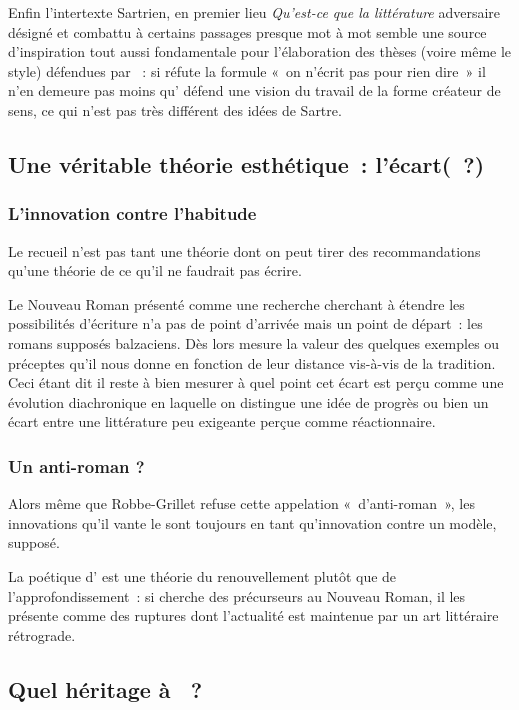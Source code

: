 \documentclass[12pt, a4paper]{article}
\begin{document}
    Enfin l'intertexte Sartrien, en premier lieu \textit{Qu'est-ce que la littérature} adversaire désigné et combattu à certains passages presque mot à mot semble une source d'inspiration tout aussi fondamentale pour l'élaboration des thèses (voire même le style) défendues par \robbe~: si \punr{} réfute la formule «~on n'écrit pas pour rien dire~» il n'en demeure pas moins qu'\robbe{} défend une vision du travail de la forme créateur de sens, ce qui n'est pas très différent des idées de Sartre.
\subsection{Une véritable théorie esthétique~: l'écart(~?)}
    \subsubsection{L'innovation contre l'habitude}
    
    Le recueil \punr{} n'est pas tant une théorie dont on peut tirer des recommandations qu'une théorie de ce qu'il ne faudrait pas écrire.
    
    Le Nouveau Roman présenté comme une recherche cherchant à étendre les possibilités d'écriture n'a pas de point d'arrivée mais un point de départ~: les romans supposés balzaciens. Dès lors \punr{} mesure la valeur des quelques exemples ou préceptes qu'il nous donne en fonction de leur distance vis-à-vis de la tradition. Ceci étant dit il reste à bien mesurer à quel point cet écart est perçu comme une évolution diachronique en laquelle on distingue une idée de progrès ou bien un écart entre une littérature peu exigeante perçue comme réactionnaire.

    
    \subsubsection{Un anti-roman ?}
    Alors même que Robbe-Grillet refuse cette appelation «~d'anti-roman~», les innovations qu'il vante le sont toujours en tant qu'innovation contre un modèle, supposé.

    La poétique d'\robbe{} est une théorie du renouvellement plutôt que de l'approfondissement~: si \punr{} cherche des précurseurs au Nouveau Roman, il les présente comme des ruptures dont l'actualité est maintenue par un art littéraire rétrograde.

     \subsection{Quel héritage à \punr{}~?}
\end{document}
